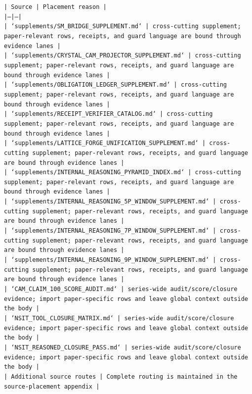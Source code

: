 \documentclass[11pt]{article}
\begin{document}
\noindent\texttt{| Source | Placement reason |}\\
\noindent\texttt{|---|---|}\\
\noindent\texttt{| `supplements/SM\_BRIDGE\_SUPPLEMENT.md` | cross-cutting supplement; paper-relevant rows, receipts, and guard language are bound through evidence lanes |}\\
\noindent\texttt{| `supplements/CRYSTAL\_CAM\_PROJECTOR\_SUPPLEMENT.md` | cross-cutting supplement; paper-relevant rows, receipts, and guard language are bound through evidence lanes |}\\
\noindent\texttt{| `supplements/OBLIGATION\_LEDGER\_SUPPLEMENT.md` | cross-cutting supplement; paper-relevant rows, receipts, and guard language are bound through evidence lanes |}\\
\noindent\texttt{| `supplements/RECEIPT\_VERIFIER\_CATALOG.md` | cross-cutting supplement; paper-relevant rows, receipts, and guard language are bound through evidence lanes |}\\
\noindent\texttt{| `supplements/LATTICE\_FORGE\_UNIFICATION\_SUPPLEMENT.md` | cross-cutting supplement; paper-relevant rows, receipts, and guard language are bound through evidence lanes |}\\
\noindent\texttt{| `supplements/INTERNAL\_REASONING\_PYRAMID\_INDEX.md` | cross-cutting supplement; paper-relevant rows, receipts, and guard language are bound through evidence lanes |}\\
\noindent\texttt{| `supplements/INTERNAL\_REASONING\_5P\_WINDOW\_SUPPLEMENT.md` | cross-cutting supplement; paper-relevant rows, receipts, and guard language are bound through evidence lanes |}\\
\noindent\texttt{| `supplements/INTERNAL\_REASONING\_7P\_WINDOW\_SUPPLEMENT.md` | cross-cutting supplement; paper-relevant rows, receipts, and guard language are bound through evidence lanes |}\\
\noindent\texttt{| `supplements/INTERNAL\_REASONING\_9P\_WINDOW\_SUPPLEMENT.md` | cross-cutting supplement; paper-relevant rows, receipts, and guard language are bound through evidence lanes |}\\
\noindent\texttt{| `CAM\_CLAIM\_100\_SCORE\_AUDIT.md` | series-wide audit/score/closure evidence; import paper-specific rows and leave global context outside the body |}\\
\noindent\texttt{| `NSIT\_TOOL\_CLOSURE\_MATRIX.md` | series-wide audit/score/closure evidence; import paper-specific rows and leave global context outside the body |}\\
\noindent\texttt{| `NSIT\_REASONED\_CLOSURE\_PASS.md` | series-wide audit/score/closure evidence; import paper-specific rows and leave global context outside the body |}\\
\noindent\texttt{| Additional source routes | Complete routing is maintained in the source-placement appendix |}\\
\end{document}
